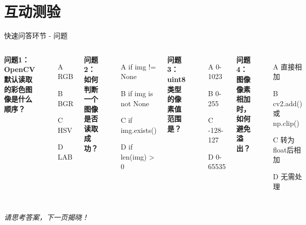 \section{互动测验}

\begin{frame}[fragile]{快速问答环节 - 问题}
    \begin{columns}
        \textbf{问题1：OpenCV默认读取的彩色图像是什么顺序？}
        \begin{itemize}
            \item[A] RGB
            \item[B] BGR
            \item[C] HSV
            \item[D] LAB
        \end{itemize}

        \vspace{0.3cm}
        \textbf{问题2：如何判断一个图像是否读取成功？}
        \begin{itemize}
            \item[A] if img != None
            \item[B] if img is not None
            \item[C] if img.exists()
            \item[D] if len(img) > 0
        \end{itemize}

        \textbf{问题3：uint8类型的像素值范围是？}
        \begin{itemize}
            \item[A] 0-1023
            \item[B] 0-255
            \item[C] -128-127
            \item[D] 0-65535
        \end{itemize}

        \vspace{0.3cm}
        \textbf{问题4：图像像素相加时，如何避免溢出？}
        \begin{itemize}
            \item[A] 直接相加
            \item[B] cv2.add() 或 np.clip()
            \item[C] 转为float后相加
            \item[D] 无需处理
        \end{itemize}
    \end{columns}

    \vspace{0.5cm}
    \begin{center}
        \Large \textit{请思考答案，下一页揭晓！}
    \end{center}
\end{frame}

